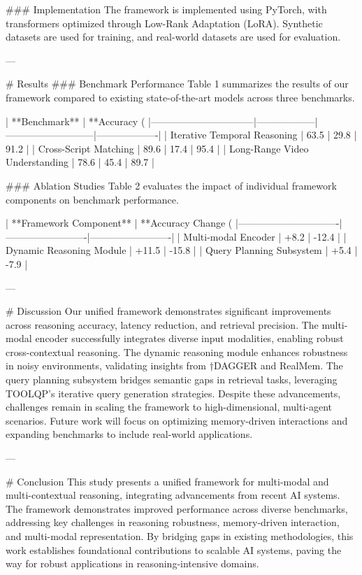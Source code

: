 ### Implementation  
The framework is implemented using PyTorch, with transformers optimized through Low-Rank Adaptation (LoRA). Synthetic datasets are used for training, and real-world datasets are used for evaluation.

---

# Results  
### Benchmark Performance  
Table 1 summarizes the results of our framework compared to existing state-of-the-art models across three benchmarks.

| **Benchmark**                  | **Accuracy (%
|--------------------------------|------------------|---------------------------|-------------------|  
| Iterative Temporal Reasoning   | 63.5             | 29.8                      | 91.2              |  
| Cross-Script Matching          | 89.6             | 17.4                      | 95.4              |  
| Long-Range Video Understanding | 78.6             | 45.4                      | 89.7              |  

### Ablation Studies  
Table 2 evaluates the impact of individual framework components on benchmark performance.

| **Framework Component**       | **Accuracy Change (%
|-------------------------------|-------------------------|-------------------------|  
| Multi-modal Encoder           | +8.2                   | -12.4                  |  
| Dynamic Reasoning Module      | +11.5                  | -15.8                  |  
| Query Planning Subsystem      | +5.4                   | -7.9                   |  

---

# Discussion  
Our unified framework demonstrates significant improvements across reasoning accuracy, latency reduction, and retrieval precision. The multi-modal encoder successfully integrates diverse input modalities, enabling robust cross-contextual reasoning. The dynamic reasoning module enhances robustness in noisy environments, validating insights from †DAGGER and RealMem. The query planning subsystem bridges semantic gaps in retrieval tasks, leveraging TOOLQP’s iterative query generation strategies. Despite these advancements, challenges remain in scaling the framework to high-dimensional, multi-agent scenarios. Future work will focus on optimizing memory-driven interactions and expanding benchmarks to include real-world applications.

---

# Conclusion  
This study presents a unified framework for multi-modal and multi-contextual reasoning, integrating advancements from recent AI systems. The framework demonstrates improved performance across diverse benchmarks, addressing key challenges in reasoning robustness, memory-driven interaction, and multi-modal representation. By bridging gaps in existing methodologies, this work establishes foundational contributions to scalable AI systems, paving the way for robust applications in reasoning-intensive domains.

